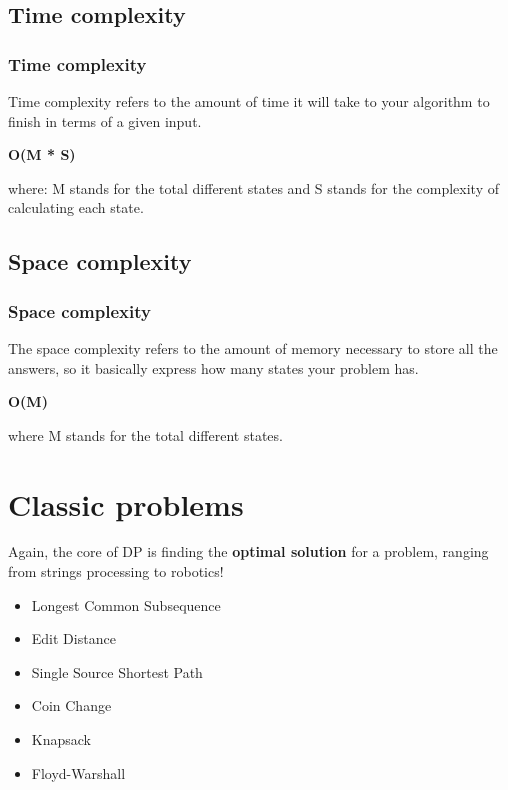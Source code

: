 \documentclass[article]{beamer}
\begin{document}
\subsection{Time complexity}
\begin{frame}
	\frametitle{Time complexity}
	Time complexity refers to the amount of time it will take to your algorithm to finish in terms of a given input. 
	
	\vspace{8mm}	
	
	\begin{center}
	\textbf{O(M * S)}
	\end{center}
	
	\vspace{8mm}
	
	where: M stands for the total different states and S stands for the complexity of calculating each state.
\end{frame}

\subsection{Space complexity}
\begin{frame}
	\frametitle{Space complexity}
	The space complexity refers to the amount of memory necessary to store all the answers, so it basically express how many states your problem has.
	
	\vspace{8mm}
	
	\begin{center}
	\textbf{O(M)}
	\end{center}
	
	\vspace{8mm}
	
	where M stands for the total different states.
\end{frame}

\section{Classic problems}
\begin{frame}
	Again, the core of DP is finding the \textbf{optimal solution} for a problem, ranging from strings processing to robotics!

	\vspace{8mm}

	\begin{itemize}
		\item Longest Common Subsequence
		\item Edit Distance
		\item Single Source Shortest Path
		\item Coin Change
		\item Knapsack
		\item Floyd-Warshall
	\end{itemize}
\end{frame}
\end{document}
